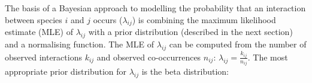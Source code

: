 \documentclass[12pt]{article}
\begin{document}
\begin{spacing}{2.0}
  






    The basis of a Bayesian approach to modelling the probability that an interaction between species $i$ and $j$ occurs ($\lambda_{ij}$) is combining the maximum likelihood estimate (MLE) of $\lambda_{ij}$ with a prior distribution (described in the next section) and a normalising function. The MLE of $\lambda_{ij}$ can be computed from the number of observed interactions $k_{ij}$ and observed co-occurrences $n_{ij}$: $\lambda_{ij}=\frac{k_{ij}}{n_{ij}}$. The most appropriate prior distribution for $\lambda_{ij}$ is the beta distribution:



\end{spacing}
\end{document}
